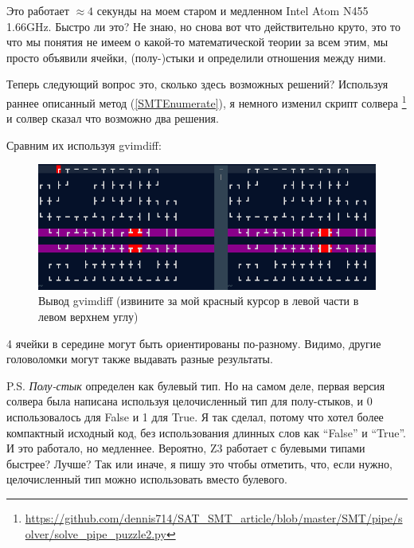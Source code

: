 Это работает $\approx 4$ секунды на моем старом и медленном Intel Atom N455 1.66GHz.
Быстро ли это? Не знаю, но снова вот что действительно круто, это то что мы понятия не имеем о какой-то математической
теории за всем этим, мы просто объявили ячейки, (полу-)стыки и определили отношения между ними.

Теперь следующий вопрос это, сколько здесь возможных решений?
Используя раннее описанный метод (\ref{SMTEnumerate}), я немного изменил скрипт солвера
\footnote{\url{https://github.com/dennis714/SAT_SMT_article/blob/master/SMT/pipe/solver/solve_pipe_puzzle2.py}} и солвер
сказал что возможно два решения.

Сравним их используя gvimdiff:

\begin{figure}[H]
\centering
\includegraphics[scale=0.75]{SMT/pipe/solver/diff.png}
\caption{Вывод gvimdiff (извините за мой красный курсор в левой части в левом верхнем углу)}
\end{figure}

4 ячейки в середине могут быть ориентированы по-разному.
Видимо, другие головоломки могут также выдавать разные результаты.

P.S.
\textit{Полу-стык} определен как булевый тип.
Но на самом деле, первая версия солвера была написана используя целочисленный тип для полу-стыков,
и 0 использовалось для False и 1 для True.
Я так сделал, потому что хотел более компактный исходный код, без использования длинных слов как ``False'' и ``True''.
И это работало, но медленнее. Вероятно, Z3 работает с булевыми типами быстрее? Лучше?
Так или иначе, я пишу это чтобы отметить, что, если нужно, целочисленный тип можно использовать вместо булевого.

